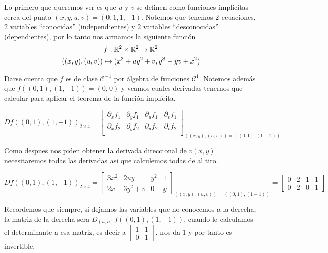 \documentclass[a4paper,oneside,10.5pt]{article}
\begin{document}
\sol Lo primero que queremos ver es que $u$ y $v$ se definen como funciones implícitas cerca del punto $(x, y, u, v) = (0, 1, 1, -1)$. Notemos que tenemos $2$ ecuaciones, $2$ variables ``conocidas'' (independientes) y $2$ variables ``desconocidas'' (dependientes), por lo tanto nos armamos la siguiente función
\begin{gather*}
    f : \mathbb{R}^2 \times \mathbb{R}^2 \to \mathbb{R}^2\\
    ((x, y), (u, v)) \mapsto (x^3 + uy^2 + v, y^3 + yv + x^2)
\end{gather*}

Darse cuenta que $f$ es de clase $\mathcal{C}^{-1}$ por álgebra de funciones $\mathcal{C}^1$. Notemos además que $f((0, 1), (1, -1)) = (0, 0)$ y veamos cuales derivadas tenemos que calcular para aplicar el teorema de la función implícita.

\begin{equation*}
    Df((0,1), (1, -1))_{2 \times 4} = \left[\begin{array}{cc|cc}
        \partial_x f_1 & \partial_y f_1 & \partial_u f_1 & \partial_v f_1\\
        \partial_x f_2 & \partial_y f_2 & \partial_u f_2 & \partial_v f_2\\
    \end{array}
    \right]_{((x, y), (u, v)) = ((0, 1), (1 -1))}
\end{equation*}

Como despues nos piden obtener la derivada direccional de $v(x, y)$ necesitaremos todas las derivadas asi que calculemos todas de al tiro.

\begin{equation}
    Df((0,1), (1, -1))_{2 \times 4} = \left[\begin{array}{cc|cc}
        3x^2 & 2uy & y^2 & 1\\
        2x & 3y^2 + v & 0 & y
    \end{array}
    \right]_{((x, y), (u, v)) = ((0, 1), (1 -1))} = \left[\begin{array}{cc|cc}
        0 & 2 & 1 & 1\\
        0 & 2 & 0 & 1
    \end{array}
    \right]
\end{equation}

Recordemos que siempre, si dejamos las variables que no conocemos a la derecha, la matriz de la derecha sera $D_{(u, v)}f((0, 1), (1, -1))$, cuando le calculamos el determinante a esa matriz, es decir a $\begin{bmatrix}1 & 1\\ 0 & 1\end{bmatrix}$, nos da $1$ y por tanto es invertible.
\end{document}
